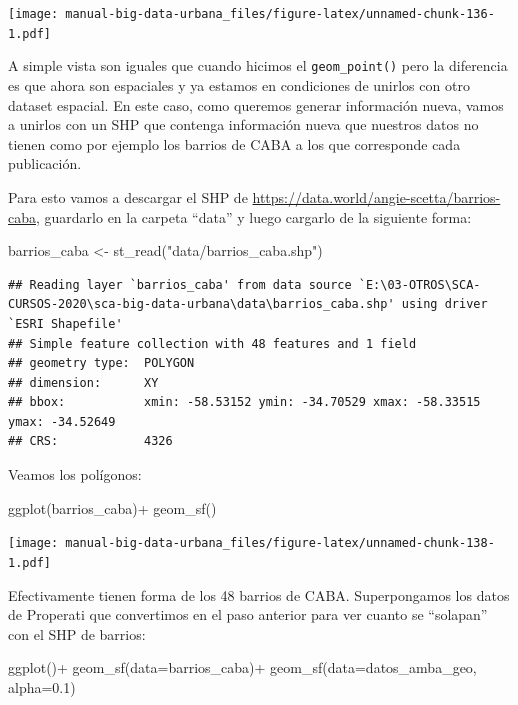 \documentclass[
  spanish,
]{book}
\newenvironment{Shaded}{\begin{snugshade}}{\end{snugshade}}
\newcommand{\AttributeTok}[1]{\textcolor[rgb]{0.77,0.63,0.00}{#1}}
\newcommand{\FloatTok}[1]{\textcolor[rgb]{0.00,0.00,0.81}{#1}}
\newcommand{\FunctionTok}[1]{\textcolor[rgb]{0.00,0.00,0.00}{#1}}
\newcommand{\NormalTok}[1]{#1}
\newcommand{\OtherTok}[1]{\textcolor[rgb]{0.56,0.35,0.01}{#1}}
\newcommand{\SpecialCharTok}[1]{\textcolor[rgb]{0.00,0.00,0.00}{#1}}
\newcommand{\StringTok}[1]{\textcolor[rgb]{0.31,0.60,0.02}{#1}}
\begin{document}
\texttt{[image: manual-big-data-urbana\_files/figure-latex/unnamed-chunk-136-1.pdf]}

A simple vista son iguales que cuando hicimos el \texttt{geom\_point()} pero la diferencia es que ahora son espaciales y ya estamos en condiciones de unirlos con otro dataset espacial. En este caso, como queremos generar información nueva, vamos a unirlos con un SHP que contenga información nueva que nuestros datos no tienen como por ejemplo los barrios de CABA a los que corresponde cada publicación.

Para esto vamos a descargar el SHP de \url{https://data.world/angie-scetta/barrios-caba}, guardarlo en la carpeta ``data'' y luego cargarlo de la siguiente forma:

\begin{Shaded}
\begin{Highlighting}[]
\NormalTok{barrios\_caba }\OtherTok{\textless{}{-}} \FunctionTok{st\_read}\NormalTok{(}\StringTok{"data/barrios\_caba.shp"}\NormalTok{)}
\end{Highlighting}
\end{Shaded}

\begin{verbatim}
## Reading layer `barrios_caba' from data source `E:\03-OTROS\SCA-CURSOS-2020\sca-big-data-urbana\data\barrios_caba.shp' using driver `ESRI Shapefile'
## Simple feature collection with 48 features and 1 field
## geometry type:  POLYGON
## dimension:      XY
## bbox:           xmin: -58.53152 ymin: -34.70529 xmax: -58.33515 ymax: -34.52649
## CRS:            4326
\end{verbatim}

Veamos los polígonos:

\begin{Shaded}
\begin{Highlighting}[]
\FunctionTok{ggplot}\NormalTok{(barrios\_caba)}\SpecialCharTok{+}
  \FunctionTok{geom\_sf}\NormalTok{()}
\end{Highlighting}
\end{Shaded}

\texttt{[image: manual-big-data-urbana\_files/figure-latex/unnamed-chunk-138-1.pdf]}

Efectivamente tienen forma de los 48 barrios de CABA. Superpongamos los datos de Properati que convertimos en el paso anterior para ver cuanto se ``solapan'' con el SHP de barrios:

\begin{Shaded}
\begin{Highlighting}[]
\FunctionTok{ggplot}\NormalTok{()}\SpecialCharTok{+}
  \FunctionTok{geom\_sf}\NormalTok{(}\AttributeTok{data=}\NormalTok{barrios\_caba)}\SpecialCharTok{+}
  \FunctionTok{geom\_sf}\NormalTok{(}\AttributeTok{data=}\NormalTok{datos\_amba\_geo, }\AttributeTok{alpha=}\FloatTok{0.1}\NormalTok{)}
\end{Highlighting}
\end{Shaded}
\end{document}
